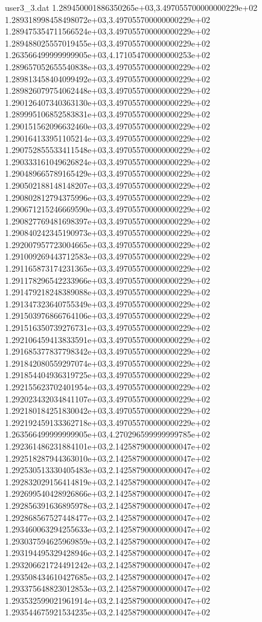 \begin{filecontents}{user3_3.dat}
1.289450001886350265e+03,3.497055700000000229e+02
1.289318998458498072e+03,3.497055700000000229e+02
1.289475354711566524e+03,3.497055700000000229e+02
1.289488025557019455e+03,3.497055700000000229e+02
1.263566499999999905e+03,4.171054700000000253e+02
1.289657052655540838e+03,3.497055700000000229e+02
1.289813458404099492e+03,3.497055700000000229e+02
1.289826079754062448e+03,3.497055700000000229e+02
1.290126407340363130e+03,3.497055700000000229e+02
1.289995106852583831e+03,3.497055700000000229e+02
1.290151562096632460e+03,3.497055700000000229e+02
1.290164133951105214e+03,3.497055700000000229e+02
1.290752855533411548e+03,3.497055700000000229e+02
1.290333161049626824e+03,3.497055700000000229e+02
1.290489665789165429e+03,3.497055700000000229e+02
1.290502188148148207e+03,3.497055700000000229e+02
1.290802812794375996e+03,3.497055700000000229e+02
1.290671215246669590e+03,3.497055700000000229e+02
1.290827769481698397e+03,3.497055700000000229e+02
1.290840242345190973e+03,3.497055700000000229e+02
1.292007957723004665e+03,3.497055700000000229e+02
1.291009269443712583e+03,3.497055700000000229e+02
1.291165873174231365e+03,3.497055700000000229e+02
1.291178296542233966e+03,3.497055700000000229e+02
1.291479218248389088e+03,3.497055700000000229e+02
1.291347323640755349e+03,3.497055700000000229e+02
1.291503976866764106e+03,3.497055700000000229e+02
1.291516350739276731e+03,3.497055700000000229e+02
1.292106459413833591e+03,3.497055700000000229e+02
1.291685377837798342e+03,3.497055700000000229e+02
1.291842080559297074e+03,3.497055700000000229e+02
1.291854404936319725e+03,3.497055700000000229e+02
1.292155623702401954e+03,3.497055700000000229e+02
1.292023432034841107e+03,3.497055700000000229e+02
1.292180184251830042e+03,3.497055700000000229e+02
1.292192459133362718e+03,3.497055700000000229e+02
1.263566499999999905e+03,4.270296599999999785e+02
1.292361486231884101e+03,2.142587900000000047e+02
1.292518287944363010e+03,2.142587900000000047e+02
1.292530513330405483e+03,2.142587900000000047e+02
1.292832029156414819e+03,2.142587900000000047e+02
1.292699540428926866e+03,2.142587900000000047e+02
1.292856391636895978e+03,2.142587900000000047e+02
1.292868567527448477e+03,2.142587900000000047e+02
1.293460063294255633e+03,2.142587900000000047e+02
1.293037594625969859e+03,2.142587900000000047e+02
1.293194495329428946e+03,2.142587900000000047e+02
1.293206621724491242e+03,2.142587900000000047e+02
1.293508434610427685e+03,2.142587900000000047e+02
1.293375648823012853e+03,2.142587900000000047e+02
1.293532599021961914e+03,2.142587900000000047e+02
1.293544675921534235e+03,2.142587900000000047e+02

\end{filecontents}
